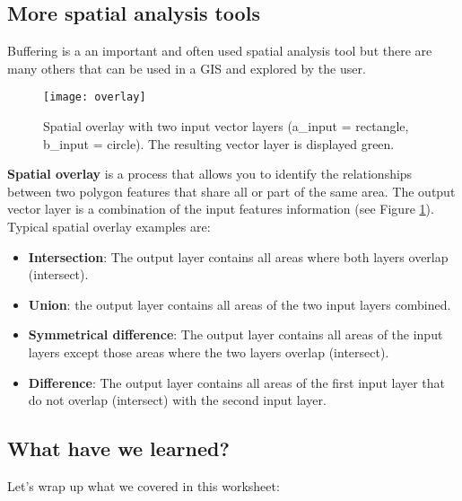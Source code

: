 \subsection{More spatial analysis tools}

Buffering is a an important and often used spatial analysis tool but there
are many others that can be used in a GIS and explored by the user. 

\begin{figure}[ht]
   \begin{center}
   \caption{Spatial overlay with two input vector layers (a\_input =
rectangle, b\_input = circle). The resulting vector layer is displayed
green.}
\label{fig:overlay}\smallskip
   \texttt{[image: overlay]}
\end{center}
\end{figure}

\textbf{Spatial overlay} is a process that allows you to identify the relationships
between two polygon features that share all or part of the same area. The
output vector layer is a combination of the input features information (see
Figure \ref{fig:overlay}). Typical spatial overlay examples are:

\begin{itemize}
\item \textbf{Intersection}: The output layer contains all areas where both
layers overlap (intersect).
\item \textbf{Union}: the output layer contains all areas of the two input
layers combined.
\item \textbf{Symmetrical difference}: The output layer contains all areas of
the input layers except those areas where the two layers overlap (intersect).
\item \textbf{Difference}: The output layer contains all areas of the first
input layer that do not overlap (intersect) with the second input layer.
\end{itemize}

\subsection{What have we learned?}

Let's wrap up what we covered in this worksheet:

